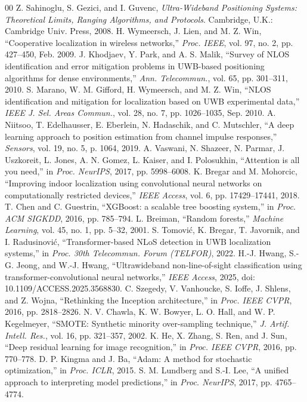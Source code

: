 \documentclass[conference]{IEEEtran}
\begin{document}
\balance
\begin{thebibliography}{00}
 Z. Sahinoglu, S. Gezici, and I. Guvenc, \textit{Ultra-Wideband Positioning Systems: Theoretical Limits, Ranging Algorithms, and Protocols}. Cambridge, U.K.: Cambridge Univ. Press, 2008.
 H. Wymeersch, J. Lien, and M. Z. Win, ``Cooperative localization in wireless networks,'' \textit{Proc. IEEE}, vol. 97, no. 2, pp. 427--450, Feb. 2009.
 J. Khodjaev, Y. Park, and A. S. Malik, ``Survey of NLOS identification and error mitigation problems in UWB-based positioning algorithms for dense environments,'' \textit{Ann. Telecommun.}, vol. 65, pp. 301--311, 2010.
 S. Marano, W. M. Gifford, H. Wymeersch, and M. Z. Win, ``NLOS identification and mitigation for localization based on UWB experimental data,'' \textit{IEEE J. Sel. Areas Commun.}, vol. 28, no. 7, pp. 1026--1035, Sep. 2010.
 A. Niitsoo, T. Edelhausser, E. Eberlein, N. Hadaschik, and C. Mutschler, ``A deep learning approach to position estimation from channel impulse responses,'' \textit{Sensors}, vol. 19, no. 5, p. 1064, 2019.
 A. Vaswani, N. Shazeer, N. Parmar, J. Uszkoreit, L. Jones, A. N. Gomez, L. Kaiser, and I. Polosukhin, ``Attention is all you need,'' in \textit{Proc. NeurIPS}, 2017, pp. 5998--6008.
 K. Bregar and M. Mohorcic, ``Improving indoor localization using convolutional neural networks on computationally restricted devices,'' \textit{IEEE Access}, vol. 6, pp. 17429--17441, 2018.
 T. Chen and C. Guestrin, ``XGBoost: a scalable tree boosting system,'' in \textit{Proc. ACM SIGKDD}, 2016, pp. 785--794.
 L. Breiman, ``Random forests,'' \textit{Machine Learning}, vol. 45, no. 1, pp. 5--32, 2001.
 S. Tomovi\'{c}, K. Bregar, T. Javornik, and I. Radusinovi\'{c}, ``Transformer-based NLoS detection in UWB localization systems,'' in \textit{Proc. 30th Telecommun. Forum (TELFOR)}, 2022.
 H.-J. Hwang, S.-G. Jeong, and W.-J. Hwang, ``Ultrawideband non-line-of-sight classification using transformer-convolutional neural networks,'' \textit{IEEE Access}, 2025, doi: 10.1109/ACCESS.2025.3568830.
 C. Szegedy, V. Vanhoucke, S. Ioffe, J. Shlens, and Z. Wojna, ``Rethinking the Inception architecture,'' in \textit{Proc. IEEE CVPR}, 2016, pp. 2818--2826.
 N. V. Chawla, K. W. Bowyer, L. O. Hall, and W. P. Kegelmeyer, ``SMOTE: Synthetic minority over-sampling technique,'' \textit{J. Artif. Intell. Res.}, vol. 16, pp. 321--357, 2002.
 K. He, X. Zhang, S. Ren, and J. Sun, ``Deep residual learning for image recognition,'' in \textit{Proc. IEEE CVPR}, 2016, pp. 770--778.
 D. P. Kingma and J. Ba, ``Adam: A method for stochastic optimization,'' in \textit{Proc. ICLR}, 2015.
 S. M. Lundberg and S.-I. Lee, ``A unified approach to interpreting model predictions,'' in \textit{Proc. NeurIPS}, 2017, pp. 4765--4774.
\end{thebibliography}
\end{document}
